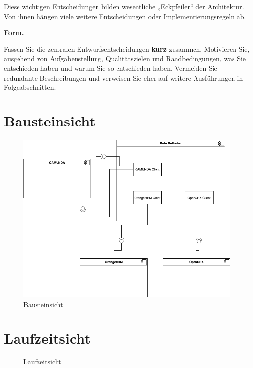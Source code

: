 \documentclass[]{article}
\begin{document}
Diese wichtigen Entscheidungen bilden wesentliche „Eckpfeiler`` der
Architektur. Von ihnen hängen viele weitere Entscheidungen oder
Implementierungsregeln ab.

\textbf{Form.}

Fassen Sie die zentralen Entwurfsentscheidungen \textbf{kurz} zusammen.
Motivieren Sie, ausgehend von Aufgabenstellung, Qualitätszielen und
Randbedingungen, was Sie entschieden haben und warum Sie so entschieden
haben. Vermeiden Sie redundante Beschreibungen und verweisen Sie eher
auf weitere Ausführungen in Folgeabschnitten.

\hypertarget{section-building-block-view}{%
\section{Bausteinsicht}\label{section-building-block-view}}

\begin{figure}[ht]
	\centering
	\includegraphics[width=1.0\linewidth]{"images/uebung6_4_baustein_sicht"}
	\caption{Bausteinsicht}
	\label{fig:uebung64bausteinsicht}
\end{figure}


\hypertarget{section-runtime-view}{\section{Laufzeitsicht}\label{section-runtime-view}}
\begin{figure}[H]
	\centering
	\caption{Laufzeitsicht}
	\label{fig:laufzeitsichthighperformancebpmn}
\end{figure}
\end{document}
